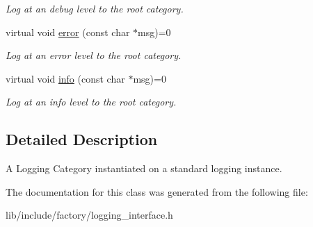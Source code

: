 \begin{DoxyCompactItemize}
\begin{DoxyCompactList}\small\item\em Log at an debug level to the root category. \end{DoxyCompactList}\item 
\hypertarget{classLoggingCategoryInterface_a526c3bec470411e17b10a6f38b5477c6}{virtual void \hyperlink{classLoggingCategoryInterface_a526c3bec470411e17b10a6f38b5477c6}{error} (const char $\ast$msg)=0}\label{classLoggingCategoryInterface_a526c3bec470411e17b10a6f38b5477c6}

\begin{DoxyCompactList}\small\item\em Log at an error level to the root category. \end{DoxyCompactList}\item 
\hypertarget{classLoggingCategoryInterface_a5e05b670e8298e0016af09ee5d1c50a6}{virtual void \hyperlink{classLoggingCategoryInterface_a5e05b670e8298e0016af09ee5d1c50a6}{info} (const char $\ast$msg)=0}\label{classLoggingCategoryInterface_a5e05b670e8298e0016af09ee5d1c50a6}

\begin{DoxyCompactList}\small\item\em Log at an info level to the root category. \end{DoxyCompactList}\end{DoxyCompactItemize}


\subsection{Detailed Description}
A Logging Category instantiated on a standard logging instance. 

The documentation for this class was generated from the following file\-:\begin{DoxyCompactItemize}
\item 
lib/include/factory/logging\-\_\-interface.\-h\end{DoxyCompactItemize}
